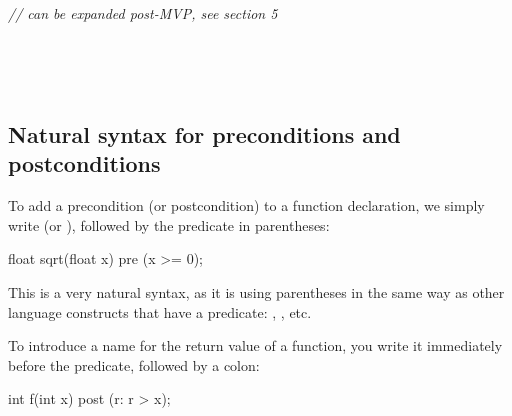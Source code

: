 \begin{adjustwidth}{0.5cm}{0.5cm}
 \\
\phantom{~~~}

 \\
\phantom{~~~}

 \\
\phantom{~~~} \phantom{~~~}\emph{// can be expanded post-MVP, see section 5}

 \\
\phantom{~~~}

 \\
\phantom{~~~}

\end{adjustwidth}


\subsection{Natural syntax for preconditions and postconditions}

To add a precondition (or postcondition) to a function declaration, we simply write  (or ), followed by the predicate in parentheses:

\vspace{2mm}
\begin{codeblock}
float sqrt(float x)
  pre (x >= 0);
\end{codeblock}
\vspace{2mm}

This is a very natural syntax, as it is using parentheses in the same way as other language constructs that have a predicate: , , etc.

To introduce a name for the return value of a function, you write it immediately before the predicate, followed by a colon:

\vspace{2mm}
\begin{codeblock}
int f(int x)
  post (r: r > x);
\end{codeblock}
\vspace{2mm}

